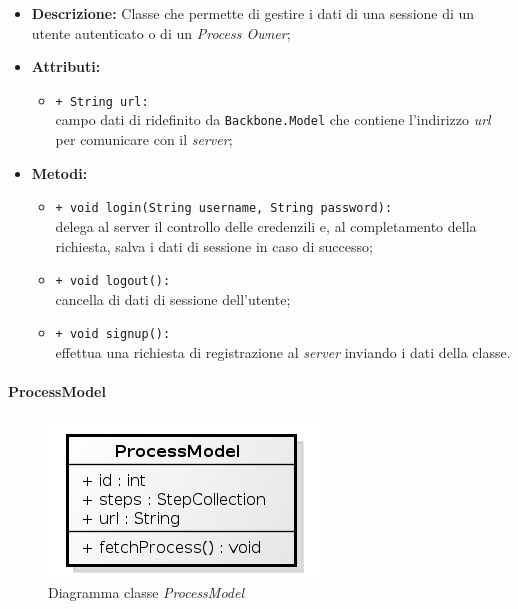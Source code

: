\begin{flushleft}
\begin{itemize}
\item \textbf{Descrizione:} Classe che permette di gestire i dati di una sessione di un utente autenticato o di un \textit{Process Owner};
\item \textbf{Attributi:}
\begin{sloppypar}
\begin{itemize}
\item \texttt{+ String url:}\\ campo dati di ridefinito da \texttt{Backbone.Model} che contiene l'indirizzo \textit{url} per comunicare con il \textit{server};
\end{itemize}
\end{sloppypar}
\item \textbf{Metodi:}
\begin{sloppypar}
\begin{itemize}
\item \texttt{+ void login(String username, String password):}\\ delega al server il controllo delle credenzili e, al completamento della richiesta, salva i dati di sessione in caso di successo;
\item \texttt{+ void logout():}\\ cancella di dati di sessione dell'utente;
\item \texttt{+ void signup():}\\ effettua una richiesta di registrazione al \textit{server} inviando i dati della classe.
\end{itemize}
\end{sloppypar}
\end{itemize}
\end{flushleft}

\paragraph{ProcessModel}
\label{processModel}

\begin{figure}[H] \centering \includegraphics[width=%
\textwidth]
{./classi/client/model/ProcessModel.png} \caption{Diagramma classe  \textit{ProcessModel}}
\end{figure}

